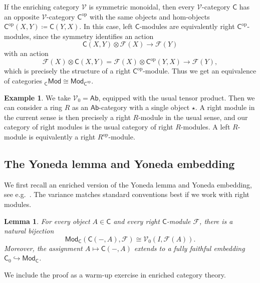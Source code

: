 \documentclass[11pt,onecolumn]{article}
\newcommand{\cV}{\mathscr{V}}
\newcommand{\cC}{\mathsf{C}}
\newcommand{\op}{\mathrm{op}}
\newcommand{\Ab}{\mathsf{Ab}}
\newcommand{\Mod}{\mathsf{Mod}}
\theoremstyle{plain}
\newtheorem{lem}[lem]{Lemma}
\theoremstyle{remark}
\theoremstyle{definition}
\newtheorem{example}[example]{Example}
\begin{document}
If the enriching category $\cV$ is symmetric monoidal, then every $\cV$-category $\cC$ has an opposite $\cV$-category $\cC^\op$ with the same objects and hom-objects $\cC^\op(X,Y) \coloneqq \cC(Y,X)$.
In this case, left $\cC$-modules are equivalently right $\cC^\op$-modules, since the symmetry identifies an action
\[
	\cC(X, Y) \otimes \mathcal{F}(X) \longrightarrow \mathcal{F}(Y)
\]
with an action
\[
	\mathcal{F}(X) \otimes \cC(X, Y) = \mathcal{F}(X) \otimes \cC^\op(Y, X) \longrightarrow \mathcal{F}(Y),
\]
which is precisely the structure of a right $\cC^\op$-module.
Thus we get an equivalence of categories ${}_\cC\Mod \cong \Mod_{\cC^\op}$.

\begin{example}
	\label{ex:ab_modules}
	We take $\cV_0 = \Ab$, equipped with the usual tensor product.
	Then we can consider a ring $R$ as an $\Ab$-category with a single object $\star$.
	A right module in the current sense is then precisely a right $R$-module in the usual sense, and our category of right modules is the usual category of right $R$-modules.
	A left $R$-module is equivalently a right $R^\op$-module.
\end{example}

\subsection{The Yoneda lemma and Yoneda embedding}

We first recall an enriched version of the Yoneda lemma and Yoneda embedding, see e.g.~\cite[\S 1.9]{Kelly}.
The variance matches standard conventions best if we work with right modules.

\begin{lem}
	\label{lem:enriched_yoneda}
	For every object $A \in \cC$ and every right $\cC$-module $\mathcal{F}$, there is a natural bijection
	\[
		\Mod_\cC(\cC(-, A), \mathcal{F}) \cong \cV_0(I, \mathcal{F}(A)).
	\]
	Moreover, the assignment $A \mapsto \cC(-, A)$ extends to a fully faithful embedding $\cC_0 \hookrightarrow \Mod_{\cC}$.
\end{lem}

We include the proof as a warm-up exercise in enriched category theory.
\end{document}
